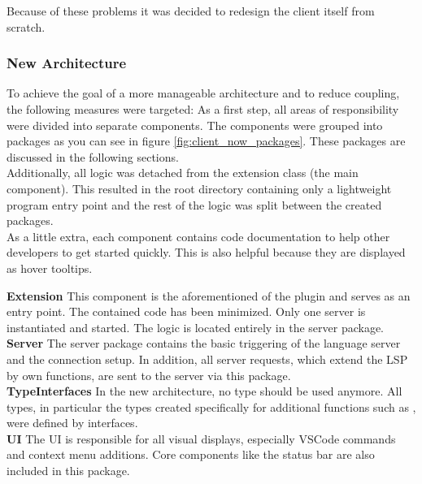 Because of these problems it was decided to redesign the client itself from scratch.

\subsubsection{New Architecture}
To achieve the goal of a more manageable architecture and to reduce coupling, the following measures were targeted:
As a first step, all areas of responsibility were divided into separate components.
The components were grouped into packages as you can see in figure \ref{fig:client_now_packages}.
These packages are discussed in the following sections. \\

Additionally, all logic was detached from the extension class (the main component).
This resulted in the root directory containing only a lightweight program entry point
and the rest of the logic was split between the created packages. \\

As a little extra, each component contains code documentation to help other developers to get started quickly. This is also helpful because they are displayed as hover tooltips.



{\bf Extension} \textendash{}
This component is the aforementioned  of the plugin and serves as an entry point. The contained code has been minimized. Only one server is instantiated and started. The logic is located entirely in the server package. \\

{\bf Server} \textendash{}
The server package contains the basic triggering  of the language server and the connection setup. In addition, all server requests, which extend the LSP by own functions, are sent to the server via this package. \\

{\bf TypeInterfaces} \textendash{}
In the new architecture, no  type should be used anymore. All types, in particular the types created specifically for additional functions such as , were defined by interfaces. \\

{\bf UI} \textendash{}
The UI is responsible for all visual displays, especially VSCode commands and context menu additions. Core components like the status bar are also included in this package. \\

